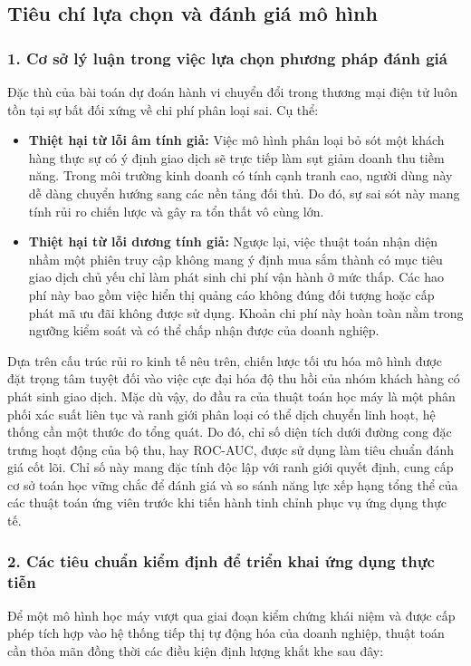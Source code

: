 \documentclass[a4paper,11pt]{article}
\begin{document}
\subsection{Tiêu chí lựa chọn và đánh giá mô hình}

\subsubsection*{1. Cơ sở lý luận trong việc lựa chọn phương pháp đánh giá}
Đặc thù của bài toán dự đoán hành vi chuyển đổi trong thương mại điện tử luôn tồn tại sự bất đối xứng về chi phí phân loại sai. Cụ thể:
\begin{itemize}
    \item \textbf{Thiệt hại từ lỗi âm tính giả:} Việc mô hình phân loại bỏ sót một khách hàng thực sự có ý định giao dịch sẽ trực tiếp làm sụt giảm doanh thu tiềm năng. Trong môi trường kinh doanh có tính cạnh tranh cao, người dùng này dễ dàng chuyển hướng sang các nền tảng đối thủ. Do đó, sự sai sót này mang tính rủi ro chiến lược và gây ra tổn thất vô cùng lớn.
    
    \item \textbf{Thiệt hại từ lỗi dương tính giả:} Ngược lại, việc thuật toán nhận diện nhầm một phiên truy cập không mang ý định mua sắm thành có mục tiêu giao dịch chủ yếu chỉ làm phát sinh chi phí vận hành ở mức thấp. Các hao phí này bao gồm việc hiển thị quảng cáo không đúng đối tượng hoặc cấp phát mã ưu đãi không được sử dụng. Khoản chi phí này hoàn toàn nằm trong ngưỡng kiểm soát và có thể chấp nhận được của doanh nghiệp.
\end{itemize}

Dựa trên cấu trúc rủi ro kinh tế nêu trên, chiến lược tối ưu hóa mô hình được đặt trọng tâm tuyệt đối vào việc cực đại hóa độ thu hồi của nhóm khách hàng có phát sinh giao dịch. Mặc dù vậy, do đầu ra của thuật toán học máy là một phân phối xác suất liên tục và ranh giới phân loại có thể dịch chuyển linh hoạt, hệ thống cần một thước đo tổng quát. Do đó, chỉ số diện tích dưới đường cong đặc trưng hoạt động của bộ thu, hay ROC-AUC, được sử dụng làm tiêu chuẩn đánh giá cốt lõi. Chỉ số này mang đặc tính độc lập với ranh giới quyết định, cung cấp cơ sở toán học vững chắc để đánh giá và so sánh năng lực xếp hạng tổng thể của các thuật toán ứng viên trước khi tiến hành tinh chỉnh phục vụ ứng dụng thực tế.

\subsubsection*{2. Các tiêu chuẩn kiểm định để triển khai ứng dụng thực tiễn}
Để một mô hình học máy vượt qua giai đoạn kiểm chứng khái niệm và được cấp phép tích hợp vào hệ thống tiếp thị tự động hóa của doanh nghiệp, thuật toán cần thỏa mãn đồng thời các điều kiện định lượng khắt khe sau đây:
\end{document}
